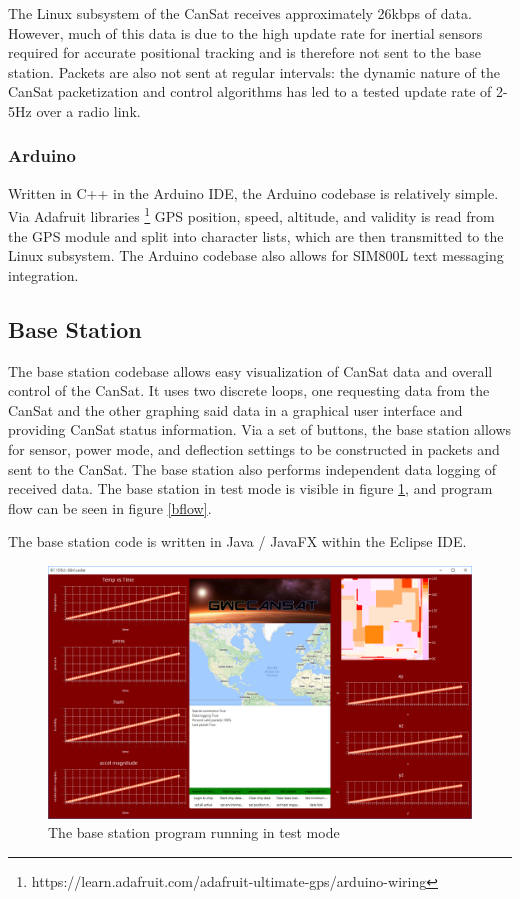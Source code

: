 \documentclass[]{report}
\begin{document}
The Linux subsystem of the CanSat receives approximately 26kbps of data. However, much of this data is due to the high update rate for inertial sensors required for accurate positional tracking and is therefore not sent to the base station. Packets are also not sent at regular intervals: the dynamic nature of the CanSat packetization and control algorithms has led to a tested update rate of 2-5Hz over a radio link.

\subsubsection{Arduino}
Written in C++ in the Arduino IDE, the Arduino codebase is relatively simple. Via Adafruit libraries \footnote{https://learn.adafruit.com/adafruit-ultimate-gps/arduino-wiring} GPS position, speed, altitude, and validity is read from the GPS module and split into character lists, which are then transmitted to the Linux subsystem. The Arduino codebase also allows for SIM800L text messaging integration.

\subsection{Base Station}
The base station codebase allows easy visualization of CanSat data and overall control of the CanSat. It uses two discrete loops, one requesting data from the CanSat and the other graphing said data in a graphical user interface and providing CanSat status information. Via a set of buttons, the base station allows for sensor, power mode, and deflection settings to be constructed in packets and sent to the CanSat. The base station also performs independent data logging of received data. The base station in test mode is visible in figure \ref{bstation}, and program flow can be seen in figure \ref{bflow}.

The base station code is written in Java / JavaFX within the Eclipse IDE.

\begin{figure}
	\hfill\includegraphics[scale=0.55]{base_station.png}\hspace*{\fill}
	\caption{The base station program running in test mode}
	\label{bstation}
\end{figure}
\end{document}
